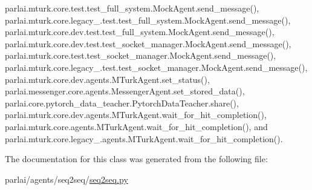 parlai.\+mturk.\+core.\+test.\+test\+\_\+full\+\_\+system.\+Mock\+Agent.\+send\+\_\+message(), parlai.\+mturk.\+core.\+legacy\+\_.\+test.\+test\+\_\+full\+\_\+system.\+Mock\+Agent.\+send\+\_\+message(), parlai.\+mturk.\+core.\+dev.\+test.\+test\+\_\+full\+\_\+system.\+Mock\+Agent.\+send\+\_\+message(), parlai.\+mturk.\+core.\+dev.\+test.\+test\+\_\+socket\+\_\+manager.\+Mock\+Agent.\+send\+\_\+message(), parlai.\+mturk.\+core.\+test.\+test\+\_\+socket\+\_\+manager.\+Mock\+Agent.\+send\+\_\+message(), parlai.\+mturk.\+core.\+legacy\+\_.\+test.\+test\+\_\+socket\+\_\+manager.\+Mock\+Agent.\+send\+\_\+message(), parlai.\+mturk.\+core.\+dev.\+agents.\+M\+Turk\+Agent.\+set\+\_\+status(), parlai.\+messenger.\+core.\+agents.\+Messenger\+Agent.\+set\+\_\+stored\+\_\+data(), parlai.\+core.\+pytorch\+\_\+data\+\_\+teacher.\+Pytorch\+Data\+Teacher.\+share(), parlai.\+mturk.\+core.\+dev.\+agents.\+M\+Turk\+Agent.\+wait\+\_\+for\+\_\+hit\+\_\+completion(), parlai.\+mturk.\+core.\+agents.\+M\+Turk\+Agent.\+wait\+\_\+for\+\_\+hit\+\_\+completion(), and parlai.\+mturk.\+core.\+legacy\+\_.\+agents.\+M\+Turk\+Agent.\+wait\+\_\+for\+\_\+hit\+\_\+completion().



The documentation for this class was generated from the following file\+:\begin{DoxyCompactItemize}
\item 
parlai/agents/seq2seq/\hyperlink{agents_2seq2seq_2seq2seq_8py}{seq2seq.\+py}\end{DoxyCompactItemize}
